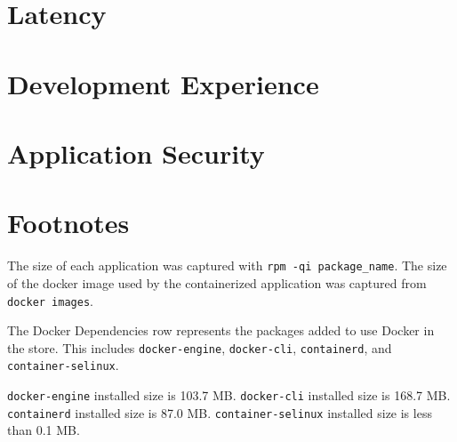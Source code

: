 \documentclass{article}
\begin{document}
\section{Latency}

\section{Development Experience}

\section{Application Security}

\section{Footnotes}
The size of each application was captured with \texttt{rpm -qi package\_name}. The size of the docker image used by the containerized application was captured from \texttt{docker images}.

The Docker Dependencies row represents the packages added to use Docker in the store. This includes \texttt{docker-engine}, \texttt{docker-cli}, \texttt{containerd}, and \texttt{container-selinux}.

\texttt{docker-engine} installed size is 103.7 MB. \texttt{docker-cli} installed size is 168.7 MB. \texttt{containerd} installed size is 87.0 MB. \texttt{container-selinux} installed size is less than 0.1 MB.
\end{document}
